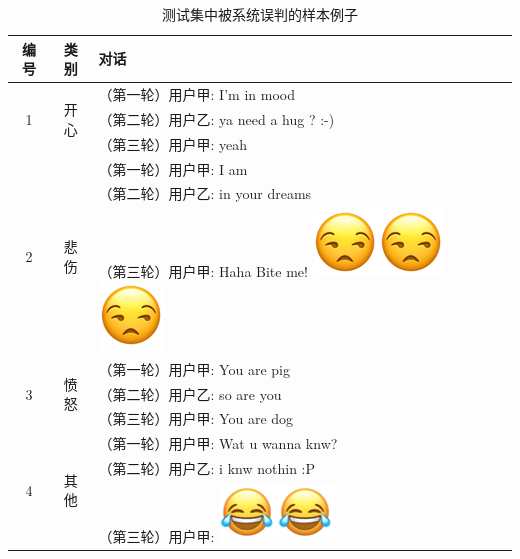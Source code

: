 \begin{itemize}
\end{itemize}


\begin{table}[]
  \centering
  \begin{minipage}[t]{0.7\linewidth}
  \caption{
    \label{tab:semeval_2019_task3_error}
    测试集中被系统误判的样本例子
  }
  \begin{tabularx}{\linewidth}{c|c|l}
  \toprule[1.5pt]

   编号 & 类别 & 对话    \\
  \hline
  \multirow{3}{*}{1} & \multirow{3}{*}{开心} 
    &   （第一轮）用户甲: I'm in mood \\
    & & （第二轮）用户乙: ya need a hug ? :-) \\
    & & （第三轮）用户甲: yeah \\
  \hline
  \multirow{3}{*}{2} & \multirow{3}{*}{悲伤} 
    &   （第一轮）用户甲: I am \\
    & & （第二轮）用户乙: in your dreams \\
    & & （第三轮）用户甲: Haha Bite me! \includegraphics[height=1.5\fontcharht\font`\B]{img/emoji/speechless.png}\includegraphics[height=1.5\fontcharht\font`\B]{img/emoji/speechless.png}\includegraphics[height=1.5\fontcharht\font`\B]{img/emoji/speechless.png} \\
  \hline
  \multirow{3}{*}{3} & \multirow{3}{*}{愤怒} 
    &   （第一轮）用户甲: You are pig \\
    & & （第二轮）用户乙: so are you \\
    & & （第三轮）用户甲: You are dog \\
  \hline
  \multirow{3}{*}{4} & \multirow{3}{*}{其他} 
    &   （第一轮）用户甲: Wat u wanna knw? \\
    & & （第二轮）用户乙: i knw nothin :P \\
    & & （第三轮）用户甲: \includegraphics[height=1.5\fontcharht\font`\B]{img/emoji/lol.png}\includegraphics[height=1.5\fontcharht\font`\B]{img/emoji/lol.png} \\

\end{tabularx}
\end{minipage}
\end{table}
